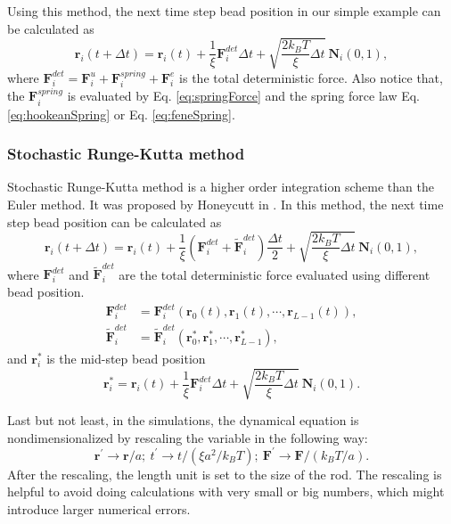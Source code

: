 Using this method, the next time step bead position in our simple example can be calculated as
\begin{equation}
    \label{eq:beadspringEuler}
    \mathbf{r}_i(t+\Delta t) = \mathbf{r}_i(t) + \frac{1}{\xi}\mathbf{F}_i^{det}\Delta t + \sqrt{\frac{2k_B T}{\xi} \Delta t}~\mathbf{N}_i (0, 1),
\end{equation}
where $\mathbf{F}_i^{det}=\mathbf{F}_i^{u}+\mathbf{F}_i^{spring}+\mathbf{F}_i^{e}$ is the total deterministic force. Also notice that, the $\mathbf{F}_i^{spring}$ is evaluated by Eq. \eqref{eq:springForce} and the spring force law Eq. \eqref{eq:hookeanSpring} or Eq. \eqref{eq:feneSpring}.

\subsubsection{Stochastic Runge-Kutta method}
Stochastic Runge-Kutta method is a higher order integration scheme than the Euler method. It was proposed by Honeycutt in \cite{Honeycutt1992a}. In this method, the next time step bead position can be calculated as
\begin{equation}
    \label{eq:beadspringRK}
    \mathbf{r}_i(t+\Delta t) = \mathbf{r}_i(t) + \frac{1}{\xi}(\mathbf{F}_i^{det}+\tilde{\mathbf{F}}_i^{det})\frac{\Delta t}{2} + \sqrt{\frac{2k_B T}{\xi} \Delta t}~\mathbf{N}_i (0, 1),
\end{equation}
where $\mathbf{F}_i^{det}$ and $\tilde{\mathbf{F}}_i^{det}$ are the total deterministic force evaluated using different bead position.
\begin{equation}
    \begin{aligned}
        \mathbf{F}_i^{det} & = \mathbf{F}_i^{det}\left(\mathbf{r}_0(t),\mathbf{r}_1(t),\cdots,\mathbf{r}_{L-1}(t)\right), \\
        \tilde{\mathbf{F}}_i^{det} & = \tilde{\mathbf{F}}_i^{det}\left(\mathbf{r}_0^*,\mathbf{r}_1^*,\cdots,\mathbf{r}_{L-1}^*\right),
    \end{aligned}
\end{equation}
and $\mathbf{r}_i^*$ is the mid-step bead position
\begin{equation}
    \mathbf{r}_i^*  = \mathbf{r}_i(t) + \frac{1}{\xi}\mathbf{F}_i^{det}\Delta t  + \sqrt{\frac{2k_B T}{\xi} \Delta t}~\mathbf{N}_i (0, 1).
\end{equation}

Last but not least, in the simulations, the dynamical equation is nondimensionalized by rescaling the variable in the following way:
\begin{equation}
    \label{eq:dimensionless}
    \mathbf{r}^{\prime}\to \mathbf{r}/a;~t^{\prime}\to t/(\xi a^2/k_BT);~\mathbf{F}^{\prime}\to\mathbf{F}/(k_BT/a).
\end{equation}
After the rescaling, the length unit is set to the size of the rod. The rescaling is helpful to avoid doing calculations with very small or big numbers, which might introduce larger numerical errors. 


